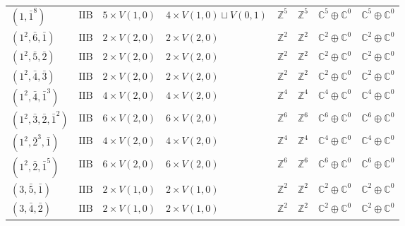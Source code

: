 \documentclass[11pt,a4paper]{article}
\begin{document}
\begin{appendix}
\begin{table}
\begin{tabular}{C{2.65cm}C{0.85cm}C{3.0cm}C{3.0cm}C{2.25cm}C{2.25cm}C{1.55cm}C{1.55cm}}
\((1, \bar{1}^{8})\) & \(\mathrm{IIB}\) & \(5 \times V(1,0)\) & \(4 \times V(1,0) \sqcup V(0,1)\) & \(\mathbb{Z}^{5}\) & \(\mathbb{Z}^{5}\) & \(\mathbb{C}^{5} \oplus \mathbb{C}^{0}\) & \(\mathbb{C}^{5} \oplus \mathbb{C}^{0}\) \\
\((1^{2}, \bar{6}, \bar{1})\) & \(\mathrm{IIB}\) & \(2 \times V(2,0)\) & \(2 \times V(2,0)\) & \(\mathbb{Z}^{2}\) & \(\mathbb{Z}^{2}\) & \(\mathbb{C}^{2} \oplus \mathbb{C}^{0}\) & \(\mathbb{C}^{2} \oplus \mathbb{C}^{0}\) \\
\((1^{2}, \bar{5}, \bar{2})\) & \(\mathrm{IIB}\) & \(2 \times V(2,0)\) & \(2 \times V(2,0)\) & \(\mathbb{Z}^{2}\) & \(\mathbb{Z}^{2}\) & \(\mathbb{C}^{2} \oplus \mathbb{C}^{0}\) & \(\mathbb{C}^{2} \oplus \mathbb{C}^{0}\) \\
\((1^{2}, \bar{4}, \bar{3})\) & \(\mathrm{IIB}\) & \(2 \times V(2,0)\) & \(2 \times V(2,0)\) & \(\mathbb{Z}^{2}\) & \(\mathbb{Z}^{2}\) & \(\mathbb{C}^{2} \oplus \mathbb{C}^{0}\) & \(\mathbb{C}^{2} \oplus \mathbb{C}^{0}\) \\
\((1^{2}, \bar{4}, \bar{1}^{3})\) & \(\mathrm{IIB}\) & \(4 \times V(2,0)\) & \(4 \times V(2,0)\) & \(\mathbb{Z}^{4}\) & \(\mathbb{Z}^{4}\) & \(\mathbb{C}^{4} \oplus \mathbb{C}^{0}\) & \(\mathbb{C}^{4} \oplus \mathbb{C}^{0}\) \\
\((1^{2}, \bar{3}, \bar{2}, \bar{1}^{2})\) & \(\mathrm{IIB}\) & \(6 \times V(2,0)\) & \(6 \times V(2,0)\) & \(\mathbb{Z}^{6}\) & \(\mathbb{Z}^{6}\) & \(\mathbb{C}^{6} \oplus \mathbb{C}^{0}\) & \(\mathbb{C}^{6} \oplus \mathbb{C}^{0}\) \\
\((1^{2}, \bar{2}^{3}, \bar{1})\) & \(\mathrm{IIB}\) & \(4 \times V(2,0)\) & \(4 \times V(2,0)\) & \(\mathbb{Z}^{4}\) & \(\mathbb{Z}^{4}\) & \(\mathbb{C}^{4} \oplus \mathbb{C}^{0}\) & \(\mathbb{C}^{4} \oplus \mathbb{C}^{0}\) \\
\((1^{2}, \bar{2}, \bar{1}^{5})\) & \(\mathrm{IIB}\) & \(6 \times V(2,0)\) & \(6 \times V(2,0)\) & \(\mathbb{Z}^{6}\) & \(\mathbb{Z}^{6}\) & \(\mathbb{C}^{6} \oplus \mathbb{C}^{0}\) & \(\mathbb{C}^{6} \oplus \mathbb{C}^{0}\) \\
\((3, \bar{5}, \bar{1})\) & \(\mathrm{IIB}\) & \(2 \times V(1,0)\) & \(2 \times V(1,0)\) & \(\mathbb{Z}^{2}\) & \(\mathbb{Z}^{2}\) & \(\mathbb{C}^{2} \oplus \mathbb{C}^{0}\) & \(\mathbb{C}^{2} \oplus \mathbb{C}^{0}\) \\
\((3, \bar{4}, \bar{2})\) & \(\mathrm{IIB}\) & \(2 \times V(1,0)\) & \(2 \times V(1,0)\) & \(\mathbb{Z}^{2}\) & \(\mathbb{Z}^{2}\) & \(\mathbb{C}^{2} \oplus \mathbb{C}^{0}\) & \(\mathbb{C}^{2} \oplus \mathbb{C}^{0}\) \\

\end{tabular}
\end{table}
\end{appendix}
\end{document}
